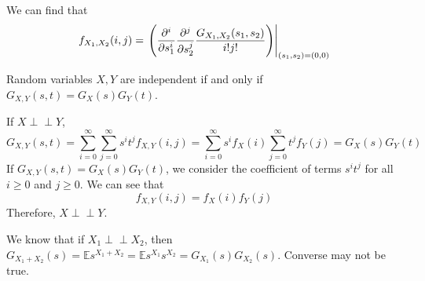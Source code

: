 \documentclass{huhtakm-template-book}
\newcommand{\independent}{\perp\!\!\!\perp}
\newcommand{\expect}{\mathbb{E}}
\begin{document}
\begin{rem}
    We can find that
    \begin{equation*}
        f_{X_{1},X_{2}}(i,j)=\left.\left(\pdv*[order={i}]{\pdv*[order={j}]{\frac{G_{X_{1},X_{2}}(s_{1},s_{2})}{i!j!}}{s_{2}}}{s_{1}}\right)\right|_{(s_{1},s_{2})=(0,0)}
    \end{equation*}
\end{rem}
\begin{thm}
    Random variables $X,Y$ are independent if and only if $G_{X,Y}(s,t)=G_{X}(s)G_{Y}(t)$.
\end{thm}
\begin{proofing}
    If $X\independent Y$,
    \begin{equation*}
        G_{X,Y}(s,t)=\sum_{i=0}^{\infty}\sum_{j=0}^{\infty}s^{i}t^{j}f_{X,Y}(i,j)=\sum_{i=0}^{\infty}s^{i}f_{X}(i)\sum_{j=0}^{\infty}t^{j}f_{Y}(j)=G_{X}(s)G_{Y}(t)
    \end{equation*}
    If $G_{X,Y}(s,t)=G_{X}(s)G_{Y}(t)$, we consider the coefficient of terms $s^{i}t^{j}$ for all $i\geq 0$ and $j\geq 0$. We can see that
    \begin{equation*}
        f_{X,Y}(i,j)=f_{X}(i)f_{Y}(j)
    \end{equation*}
    Therefore, $X\independent Y$.
\end{proofing}
\begin{rem}
    We know that if $X_{1}\independent X_{2}$, then $G_{X_{1}+X_{2}}(s)=\expect s^{X_{1}+X_{2}}=\expect s^{X_{1}}s^{X_{2}}=G_{X_{1}}(s)G_{X_{2}}(s)$. Converse may not be true.
\end{rem}
\end{document}
